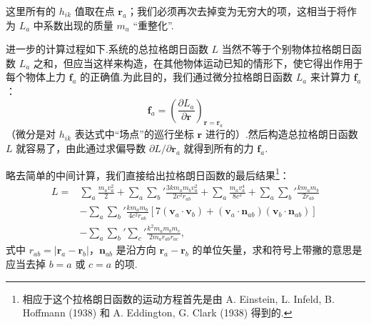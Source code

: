 这里所有的 $h_{ik}$ 值取在点 $\boldsymbol{r}_a$；我们必须再次去掉变为无穷大的项，这相当于将作为 $L_a$ 中系数出现的质量 $m_a$ “重整化”.

进一步的计算过程如下.系统的总拉格朗日函数 $L$ 当然不等于个别物体拉格朗日函数 $L_a$ 之和，但应当这样来构造，在其他物体运动已知的情形下，使它得出作用于每个物体上力 $\boldsymbol{f}_a$ 的正确值.为此目的，我们通过微分拉格朗日函数 $L_a$ 来计算力 $\boldsymbol{f}_a$：
\begin{equation*}
  \boldsymbol{f}_a
  =\left(\frac{\partial L_a}{\partial\boldsymbol{r}}\right)
  _{\boldsymbol{r}=\boldsymbol{r}_a}
\end{equation*}
（微分是对 $h_{ik}$ 表达式中“场点”的巡行坐标 $\boldsymbol{r}$ 进行的）.然后构造总拉格朗日函数 $L$ 就容易了，由此通过求偏导数 $\partial L/\partial\boldsymbol{r}_a$ 就得到所有的力 $\boldsymbol{f}_a$.

略去简单的中间计算，我们直接给出拉格朗日函数的最后结果\footnote{相应于这个拉格朗日函数的运动方程首先是由 A. Einstein, L. Infeld, B. Hoffmann (1938) 和 A. Eddington, G. Clark (1938) 得到的.}：
\begin{equation}
\begin{aligned}
  L={}&\sum_a\frac{m_av_a^{2}}{2}
  +\sum_a\sum_b'\frac{3km_am_bv_a^{2}}{2c^{2}r_{ab}}
  +\sum_a\frac{m_av_a^{4}}{8c^{2}}
  +\sum_a\sum_b'\frac{km_am_b}{2r_{ab}}\\
  &-\sum_a\sum_b'\frac{km_am_b}{4c^{2}r_{ab}}
  \left[7(\boldsymbol{v}_a\cdot\boldsymbol{v}_b)
  +(\boldsymbol{v}_a\cdot\boldsymbol{n}_{ab})
  (\boldsymbol{v}_b\cdot\boldsymbol{n}_{ab})\right]\\
  &-\sum_a\sum_b'\sum_c'
  \frac{k^{2}m_am_bm_c}{2m_ar_{ab}r_{ac}},
\end{aligned}
\end{equation}
式中 $r_{ab}=|\boldsymbol{r}_a-\boldsymbol{r}_b|$，$\boldsymbol{n}_{ab}$ 是沿方向 $\boldsymbol{r}_a-\boldsymbol{r}_b$ 的单位矢量，求和符号上带撇的意思是应当去掉 $b=a$ 或 $c=a$ 的项.

